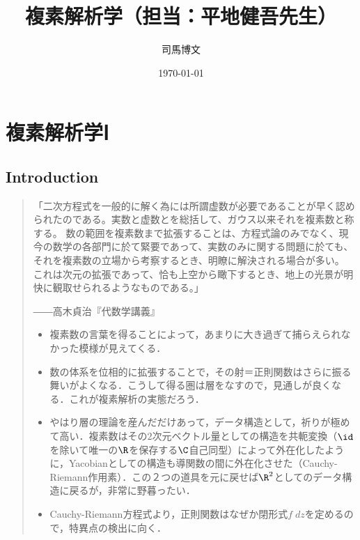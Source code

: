 \documentclass[uplatex, dvipdfmx]{jsreport}
\title{複素解析学（担当：平地健吾先生）}
\author{司馬博文}
\date{\today}
\begin{document}
\tableofcontents

\part{複素解析学Ⅰ}

\chapter{Introduction}

\begin{quotation}
    「二次方程式を一般的に解く為には所謂虚数が必要であることが早く認められたのである。実数と虚数とを総括して、ガウス以来それを複素数と称する。
    数の範囲を複素数まで拡張することは、方程式論のみでなく、現今の数学の各部門に於て緊要であって、実数のみに関する問題に於ても、それを複素数の立場から考察するとき、明瞭に解決される場合が多い。
    これは次元の拡張であって、恰も上空から瞰下するとき、地上の光景が明快に観取せられるようなものである。」
    \begin{flushright}
        ――高木貞治『代数学講義』
    \end{flushright}
    \begin{itemize}
        \item 複素数の言葉を得ることによって，あまりに大き過ぎて捕らえられなかった模様が見えてくる．
        \item 数の体系を位相的に拡張することで，その射＝正則関数はさらに振る舞いがよくなる．こうして得る圏は層をなすので，見通しが良くなる．これが複素解析の実態だろう．
        \item やはり層の理論を産んだだけあって，データ構造として，祈りが極めて高い．複素数はその$2$次元ベクトル量としての構造を共軛変換（$\id$を除いて唯一の$\R$を保存する$\C$自己同型）によって外在化したように，Yacobianとしての構造も導関数の間に外在化させた（Cauchy-Riemann作用素）．この２つの道具を元に戻せば$\R^2$としてのデータ構造に戻るが，非常に野暮ったい．
        \item Cauchy-Riemann方程式より，正則関数はなぜか閉形式$f\;dz$を定めるので，特異点の検出に向く．
    \end{itemize}
\end{quotation}
\end{document}
